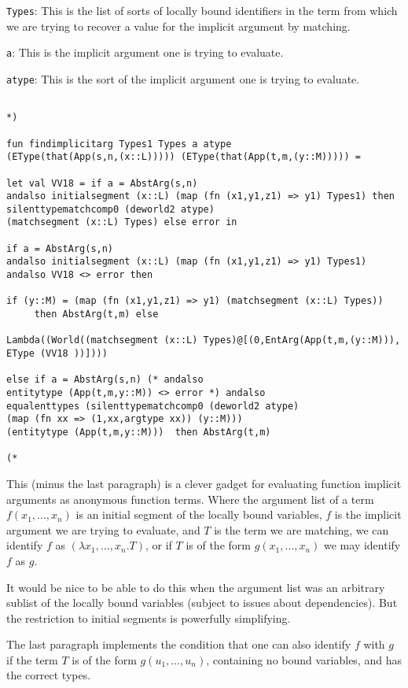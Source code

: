 \documentclass{article}
\begin{document}
{\tt Types}:  This is the list of sorts of locally bound identifiers  in the term from which we are trying to recover a value for the implicit argument by matching.

{\tt a}:  This is the implicit argument one is trying to evaluate.

{\tt atype}:  This is the sort of the implicit argument one is trying to evaluate.

\begin{verbatim}

*)

fun findimplicitarg Types1 Types a atype 
(EType(that(App(s,n,(x::L))))) (EType(that(App(t,m,(y::M))))) =

let val VV18 = if a = AbstArg(s,n) 
andalso initialsegment (x::L) (map (fn (x1,y1,z1) => y1) Types1) then
silenttypematchcomp0 (deworld2 atype) 
(matchsegment (x::L) Types) else error in

if a = AbstArg(s,n) 
andalso initialsegment (x::L) (map (fn (x1,y1,z1) => y1) Types1)
andalso VV18 <> error then

if (y::M) = (map (fn (x1,y1,z1) => y1) (matchsegment (x::L) Types)) 
     then AbstArg(t,m) else

Lambda((World((matchsegment (x::L) Types)@[(0,EntArg(App(t,m,(y::M))),
EType (VV18 ))])))

else if a = AbstArg(s,n) (* andalso 
entitytype (App(t,m,y::M)) <> error *) andalso
equalenttypes (silenttypematchcomp0 (deworld2 atype) 
(map (fn xx => (1,xx,argtype xx)) (y::M))) 
(entitytype (App(t,m,y::M)))  then AbstArg(t,m)

(*

\end{verbatim}

This (minus the last paragraph) is a clever gadget for evaluating function implicit arguments as anonymous function terms.  Where
the argument list of a term $f(x_1,\ldots,x_n)$ is an initial segment of the locally bound variables, $f$ is the implicit
argument we are trying to evaluate, and $T$ is the term we are matching, we can identify $f$ as $(\lambda x_1,\ldots,x_n.T)$,
or if $T$ is of the form $g(x_1,\ldots,x_n)$ we may identify $f$ as $g$.   

It would be nice to be able to do this when the argument list was an arbitrary sublist of the locally bound variables (subject to issues
about dependencies).  But the restriction to initial segments is powerfully simplifying.

The last paragraph implements the condition that one can also identify $f$ with $g$
if the term $T$ is of the form $g(u_1,\ldots,u_n)$, containing no bound variables, and has the correct types.
\end{document}
